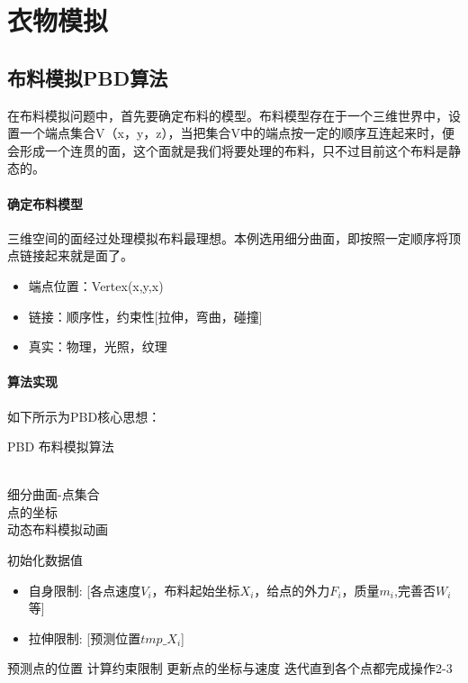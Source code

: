 \documentclass[UTF8,a4paper,8pt]{ctexart}
\begin{document}
\newpage				
\section{衣物模拟}
	\subsection{布料模拟PBD算法}在布料模拟问题中，首先要确定布料的模型。布料模型存在于一个三维世界中，设置一个端点集合V（x，y，z），当把集合V中的端点按一定的顺序互连起来时，便会形成一个连贯的面，这个面就是我们将要处理的布料，只不过目前这个布料是静态的。
		\paragraph{确定布料模型}三维空间的面经过处理模拟布料最理想。本例选用细分曲面，即按照一定顺序将顶点链接起来就是面了。
			\begin{itemize}
				\item  端点位置：Vertex(x,y,x)
				\item  链接：顺序性，约束性[拉伸，弯曲，碰撞]
				\item  真实：物理，光照，纹理
			\end{itemize}
		
		\paragraph{算法实现}如下所示为PBD核心思想：
			\begin{algorithm}[htb]
				\caption{PBD 布料模拟算法}
				\label{alg:Cloth_Simulation_PBD}
				\begin{algorithmic}[1]
					\REQUIRE ~~\\ 
					细分曲面-点集合 \\
					点的坐标
					\ENSURE ~~\\
					动态布料模拟动画
					
					\STATE 初始化数据值
							\begin{itemize}
								\item   自身限制: [各点速度$V_i$，布料起始坐标$X_i$，给点的外力$F_i$，质量$m_i$,完善否$W_i$等]
								
								\item 拉伸限制: [预测位置$tmp\_X_i$]
							\end{itemize}
					\STATE 预测点的位置
					\STATE 计算约束限制
					\STATE 更新点的坐标与速度 
					\STATE 迭代直到各个点都完成操作2-3
				\end{algorithmic}
			\end{algorithm}
\end{document}
